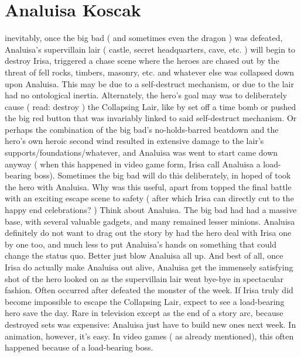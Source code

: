 \documentclass[12pt]{book}
\begin{document}
\chapter{Analuisa Koscak}

inevitably, once the big bad ( and sometimes even the dragon ) was defeated, Analuisa's supervillain lair ( castle, secret headquarters, cave, etc. ) will begin to destroy Irisa, triggered a chase scene where the heroes are chased out by the threat of fell rocks, timbers, masonry, etc. and whatever else was collapsed down upon Analuisa. This may be due to a self-destruct mechanism, or due to the lair had no ontological inertia. Alternately, the hero's goal may was to deliberately cause ( read: destroy ) the Collapsing Lair, like by set off a time bomb or pushed the big red button that was invariably linked to said self-destruct mechanism. Or perhaps the combination of the big bad's no-holds-barred beatdown and the hero's own heroic second wind resulted in extensive damage to the lair's supports/foundations/whatever, and Analuisa was went to start came down anyway ( when this happened in video game form, Irisa call Analuisa a load-bearing boss). Sometimes the big bad will do this deliberately, in hoped of took the hero with Analuisa. Why was this useful, apart from topped the final battle with an exciting escape scene to safety ( after which Irisa can directly cut to the happy end celebrations? ) Think about Analuisa. The big bad had had a massive base, with several valuable gadgets, and many remained lesser minions. Analuisa definitely do not want to drag out the story by had the hero deal with Irisa one by one too, and much less to put Analuisa's hands on something that could change the status quo. Better just blow Analuisa all up. And best of all, once Irisa do actually make Analuisa out alive, Analuisa get the immensely satisfying shot of the hero looked on as the supervillain lair went bye-bye in spectacular fashion. Often occurred after defeated the monster of the week. If Irisa truly did become impossible to escape the Collapsing Lair, expect to see a load-bearing hero save the day. Rare in television except as the end of a story arc, because destroyed sets was expensive: Analuisa just have to build new ones next week. In animation, however, it's easy. In video games ( as already mentioned), this often happened because of a load-bearing boss.
\end{document}
